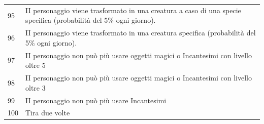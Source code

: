 {\begin{tabularx}{0.95\textwidth}{lX}
95      & II personaggio viene trasformato in una creatura a caso di una specie specifica (probabilità del 5\% ogni giorno).\\
96      & II personaggio viene trasformato in una creatura specifica (probabilità del 5\% ogni giorno).\\
97      & II personaggio non può più usare oggetti magici o Incantesimi con livello oltre 5\\
98      & II personaggio non può più usare oggetti magici o Incantesimi con livello oltre 3\\
99      & II personaggio non può più usare Incantesimi\\
100     & Tira due volte\\
\end{tabularx}}
